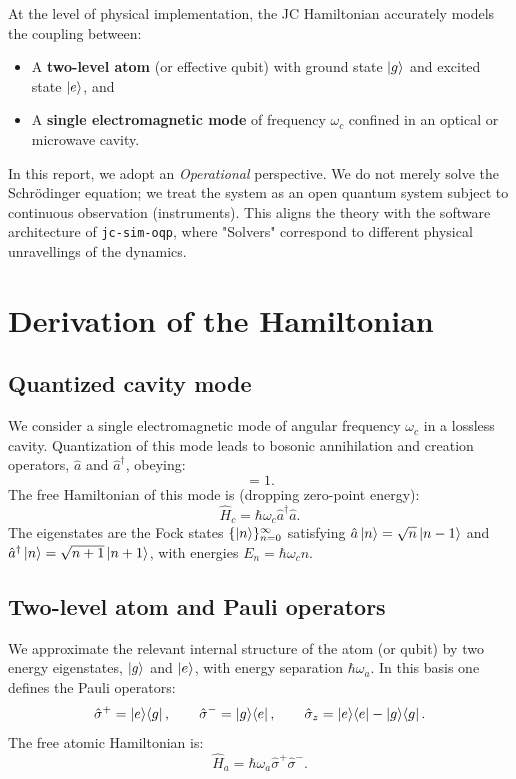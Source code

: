 \documentclass[11pt,a4paper]{article}
\newcommand{\hc}{\hat{a}}
\newcommand{\hcd}{\hat{a}^\dagger}
\newcommand{\sigmap}{\hat{\sigma}^+}
\newcommand{\sigmam}{\hat{\sigma}^-}
\newcommand{\sigmaz}{\hat{\sigma}_z}
\theoremstyle{definition}
\begin{document}
At the level of physical implementation, the JC Hamiltonian accurately models the coupling between:
\begin{itemize}
  \item A \textbf{two-level atom} (or effective qubit) with ground state $\ket{g}$ and excited state $\ket{e}$, and
  \item A \textbf{single electromagnetic mode} of frequency $\omega_c$ confined in an optical or microwave cavity.
\end{itemize}

In this report, we adopt an \emph{Operational} perspective. We do not merely solve the Schrödinger equation; we treat the system as an open quantum system subject to continuous observation (instruments). This aligns the theory with the software architecture of \texttt{jc-sim-oqp}, where "Solvers" correspond to different physical unravellings of the dynamics.

\section{Derivation of the Hamiltonian}
\label{sec:theory}

\subsection{Quantized cavity mode}

We consider a single electromagnetic mode of angular frequency $\omega_c$ in a lossless cavity.
Quantization of this mode leads to bosonic annihilation and creation operators, $\hc$ and $\hcd$, obeying:
\begin{equation}
  [\hc, \hcd] = 1.
\end{equation}
The free Hamiltonian of this mode is (dropping zero-point energy):
\begin{equation}
  \hat{H}_c = \hbar\omega_c \hcd \hc.
\end{equation}
The eigenstates are the Fock states $\{\ket{n}\}_{n=0}^\infty$ satisfying $\hc\ket{n} = \sqrt{n}\ket{n-1}$ and $\hcd\ket{n} = \sqrt{n+1}\ket{n+1}$, with energies $E_n = \hbar\omega_c n$.

\subsection{Two-level atom and Pauli operators}

We approximate the relevant internal structure of the atom (or qubit) by two energy eigenstates, $\ket{g}$ and $\ket{e}$, with energy separation $\hbar\omega_a$.
In this basis one defines the Pauli operators:
\begin{equation}
  \sigmap = \ket{e}\!\bra{g}, \qquad
  \sigmam = \ket{g}\!\bra{e}, \qquad
  \sigmaz = \ket{e}\!\bra{e} - \ket{g}\!\bra{g}.
\end{equation}
The free atomic Hamiltonian is:
\begin{equation}
  \hat{H}_a = \hbar\omega_a \sigmap \sigmam.
\end{equation}
\end{document}

